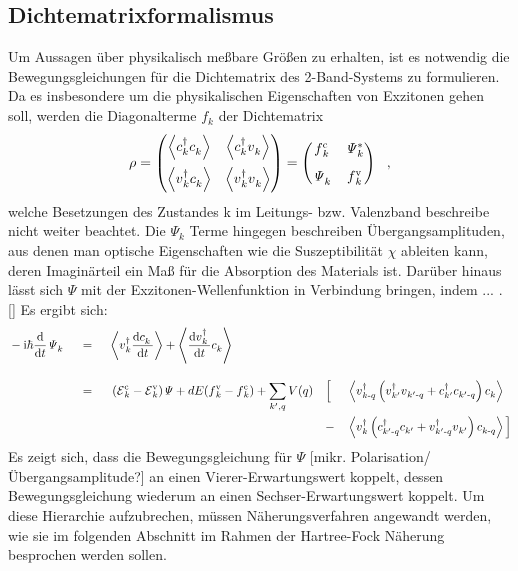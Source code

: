 \documentclass[a4paper,11pt]{article}
\newcommand{\ind}[2]{{_{#1}^{#2}}}
\newcommand{\+}{\dagger}
\newcommand{\E}{\mathcal{E}}
\newcommand{\dt}[1]{\frac{\tt d #1}{\tt d t}}
\newcommand{\bra}{\left \langle}
\newcommand{\ket}{\right \rangle}
\renewcommand{\^}{\hat}
\renewcommand{\tt}{\text}
\renewcommand{\~}{\widetilde}
\begin{document}
\subsection{Dichtematrixformalismus}
Um Aussagen über physikalisch meßbare Größen zu erhalten, ist es notwendig die Bewegungsgleichungen für die Dichtematrix des 2-Band-Systems zu formulieren. Da es insbesondere um die physikalischen Eigenschaften von Exzitonen gehen soll, werden die Diagonalterme $f\ind{k}{}$  der Dichtematrix
\begin{align*}
\rho 
= \begin{pmatrix}
\bra c\ind{k}{\+}c\ind{k}{} \ket & \bra c\ind{k}{\+}v\ind{k}{} \ket \\[8pt]
\bra v\ind{k}{\+}c\ind{k}{} \ket & \bra v\ind{k}{\+}v\ind{k}{}  \ket
\end{pmatrix}
=\begin{pmatrix}
f\ind{k}{\tt c}& \mathit{\Psi}\ind{k}{*}  \\[8pt]
\mathit{\Psi}\ind{k}{} & f\ind{k}{\tt v}
\end{pmatrix}\ \ ,
\end{align*}
welche Besetzungen des Zustandes k im Leitungs- bzw. Valenzband beschreibe nicht weiter beachtet. Die $\mathit{\Psi}_k$ Terme hingegen beschreiben Übergangsamplituden, aus denen man optische Eigenschaften wie die Suszeptibilität $\chi$ ableiten kann, deren Imaginärteil ein Maß für die Absorption des Materials ist. Darüber hinaus lässt sich $\mathit{\Psi}$ mit der Exzitonen-Wellenfunktion in Verbindung bringen, indem ... . []
Es ergibt sich: 
\begin{alignat*}{5}
& -\tt i\hbar \dt{}\mathit{\Psi}\ind{k}{}  && \ = \ &&  \bra  v\ind{k}{\+}\dt{c\ind{k}{}\,} \ket + \bra \dt{v\ind{k}{\+}\,}c\ind{k}{} \ket &&  &&\\[8pt]
& && \ = \ &&\ (\E \ind{k}{\tt c}-\E \ind{k}{\tt v})\mathit{\Psi}+dE(f\ind{k}{\tt v}-f\ind{k}{\tt c}) 
+ \sum_{k',q}^{} V(q)  &&\Big [ &&\bra  v\ind{k\tt -q}{\+}\left (v\ind{k'}{\+}v\ind{k'\tt -q}{}+c\ind{k'}{\+}c\ind{k'\tt-q}{}\right )c\ind{k}{} 		\ket  \\  
& && && 			   			 &&	-	   &&\bra  v\ind{k}{\+}\left (c\ind{k'\tt -q}{\+}c\ind{k'}{}+v\ind{k'\tt-q}{\+}v\ind{k'}{}\right )c\ind{k\tt -q}{}		\ket  \Big ] 	
\end{alignat*}
Es zeigt sich, dass die Bewegungsgleichung für $\mathit{\Psi}$ [mikr. Polarisation/ Übergangsamplitude?] an einen Vierer-Erwartungswert koppelt, dessen Bewegungsgleichung wiederum an einen Sechser-Erwartungswert koppelt.  Um diese Hierarchie aufzubrechen, müssen Näherungsverfahren angewandt werden, wie sie im folgenden Abschnitt im Rahmen der Hartree-Fock Näherung besprochen werden sollen. 
\end{document}
